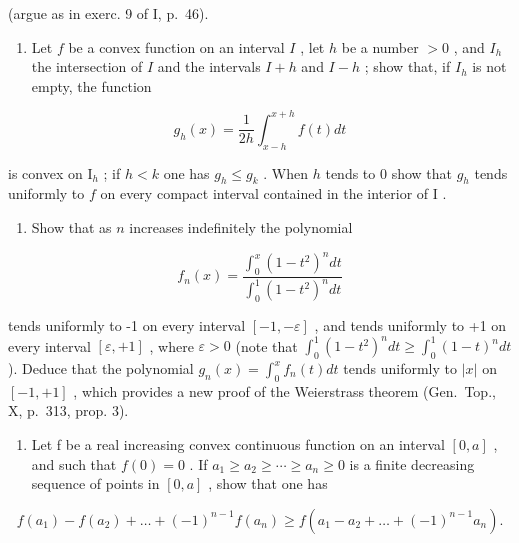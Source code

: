 (argue as in exerc. 9 of I, p.~46).

\begin{enumerate}
\def\labelenumi{\arabic{enumi})}
\setcounter{enumi}{18}
\tightlist
\item
  Let \(f\) be a convex function on an interval \(I\) , let \(h\) be a number \(> 0\) , and \(I_h\) the intersection of \(I\) and the intervals \(I + h\) and \(I - h\) ; show that, if \(I_h\) is not empty, the function
\end{enumerate}

\[
g _ {h} (x) = \frac {1}{2 h} \int_ {x - h} ^ {x + h} f (t) d t
\]

is convex on \(\mathrm{I}_h\) ; if \(h < k\) one has \(g_h \leqslant g_k\) . When \(h\) tends to 0 show that \(g_h\) tends uniformly to \(f\) on every compact interval contained in the interior of \(\mathrm{I}\) .

\begin{enumerate}
\def\labelenumi{\arabic{enumi})}
\setcounter{enumi}{19}
\tightlist
\item
  Show that as \(n\) increases indefinitely the polynomial
\end{enumerate}

\[
f _ {n} (x) = \frac {\int_ {0} ^ {x} (1 - t ^ {2}) ^ {n} d t}{\int_ {0} ^ {1} (1 - t ^ {2}) ^ {n} d t}
\]

tends uniformly to -1 on every interval \([-1, -\varepsilon]\) , and tends uniformly to +1 on every interval \([\varepsilon, +1]\) , where \(\varepsilon > 0\) (note that \(\int_{0}^{1}(1-t^{2})^{n}dt \geqslant \int_{0}^{1}(1-t)^{n}dt\) ). Deduce that the polynomial \(g_{n}(x) = \int_{0}^{x} f_{n}(t)dt\) tends uniformly to \(|x|\) on \([-1, +1]\) , which provides a new proof of the Weierstrass theorem (Gen.~Top., X, p.~313, prop. 3).

\begin{enumerate}
\def\labelenumi{\arabic{enumi})}
\setcounter{enumi}{20}
\tightlist
\item
  Let f be a real increasing convex continuous function on an interval \([0, a]\) , and such that \(f(0) = 0\) . If \(a_{1} \geqslant a_{2} \geqslant \cdots \geqslant a_{n} \geqslant 0\) is a finite decreasing sequence of points in \([0, a]\) , show that one has
\end{enumerate}

\[
f \left(a _ {1}\right) - f \left(a _ {2}\right) + \dots + (- 1) ^ {n - 1} f \left(a _ {n}\right) \geqslant f \left(a _ {1} - a _ {2} + \dots + (- 1) ^ {n - 1} a _ {n}\right).
\]

